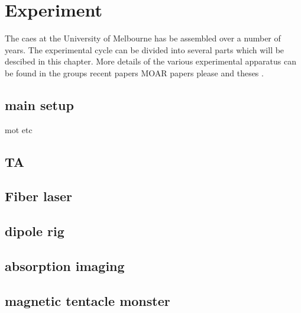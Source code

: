 \chapter{Experiment}

The \gls{caes} at the University of Melbourne has be assembled over a number of years. The experimental cycle can be divided into several parts which will be descibed in this chapter. More details of the various experimental apparatus can be found in the groups recent papers \cite{mcculloch_arbitrarily_2011} {\color{red} MOAR papers please} and theses \cite{mcculloch_electron_2012, sheludko_shaped_2010, saliba_partially_2011}.

\section{main setup}

mot etc

\section{TA}

\section{Fiber laser}

\section{dipole rig}

\section{absorption imaging}

\section{magnetic tentacle monster}


